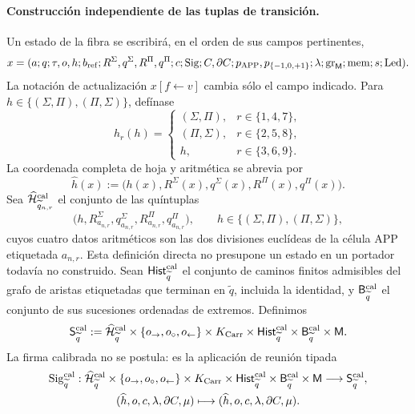 \paragraph{Construcción independiente de las tuplas de transición.}
Un estado de la fibra se escribirá, en el orden de sus campos pertinentes,
\[
 x=(a;q;\tau,o,h;b_{\rm ref};
       R^\Sigma,q^\Sigma,R^\Pi,q^\Pi;c;
       \operatorname{Sig};C,\partial C;p_{\mathrm{APP}},p_{\{-1,0,+1\}};
       \lambda;\operatorname{gr}_{\mathsf M};\operatorname{mem};
       s;\operatorname{Led}).
\]
La notación de actualización \(x[f\leftarrow v]\) cambia sólo el campo
indicado. Para \(h\in\{(\Sigma,\Pi),(\Pi,\Sigma)\}\), defínase
\[
 h_r(h)=
 \begin{cases}
  (\Sigma,\Pi),&r\in\{1,4,7\},\\
  (\Pi,\Sigma),&r\in\{2,5,8\},\\
 h,&r\in\{3,6,9\}.
 \end{cases}
\]
La coordenada completa de hoja y aritmética se abrevia por
\[
 \widehat h(x):=
 \bigl(h(x),R^\Sigma(x),q^\Sigma(x),R^\Pi(x),q^\Pi(x)\bigr).
\]
Sea \(\widehat{\mathcal H}^{\rm cal}_{\widetilde q_{n,r}}\) el conjunto de
las quíntuplas
\[
 \bigl(h,R^\Sigma_{a_{n,r}},q^\Sigma_{a_{n,r}},
          R^\Pi_{a_{n,r}},q^\Pi_{a_{n,r}}\bigr),
 \qquad
 h\in\{(\Sigma,\Pi),(\Pi,\Sigma)\},
\]
cuyos cuatro datos aritméticos son las dos divisiones euclídeas de la célula
APP etiquetada \(a_{n,r}\). Esta definición directa no presupone un estado
en un portador todavía no construido. Sean
\(\mathsf{Hist}^{\rm cal}_{\widetilde q}\) el conjunto de caminos finitos
admisibles del grafo de aristas etiquetadas que terminan en
\(\widetilde q\), incluida la identidad, y
\(\mathsf B^{\rm cal}_{\widetilde q}\) el conjunto de sus sucesiones
ordenadas de extremos. Definimos
\[
 \mathsf S^{\rm cal}_{\widetilde q}:=
 \widehat{\mathcal H}^{\rm cal}_{\widetilde q}
 \times\{o_{\rightarrow},o_{\circ},o_{\leftarrow}\}
 \times K_{\rm Carr}\times
 \mathsf{Hist}^{\rm cal}_{\widetilde q}\times
 \mathsf B^{\rm cal}_{\widetilde q}\times\mathsf M .
\]
La firma calibrada no se postula: es la aplicación de reunión tipada
\[\begin{gathered}
 \operatorname{Sig}^{\rm cal}_{\widetilde q}:
 \widehat{\mathcal H}^{\rm cal}_{\widetilde q}
 \times\{o_{\rightarrow},o_{\circ},o_{\leftarrow}\}
 \times K_{\rm Carr}\times
 \mathsf{Hist}^{\rm cal}_{\widetilde q}\times
 \mathsf B^{\rm cal}_{\widetilde q}\times\mathsf M
 \longrightarrow\mathsf S^{\rm cal}_{\widetilde q},
\\
 (\widehat h,o,c,\lambda,\partial C,\mu)
 \longmapsto(\widehat h,o,c,\lambda,\partial C,\mu).
\end{gathered}\]
